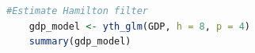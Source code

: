 \documentclass[addpoints,12pt,answers]{exam}
\begin{document}
\begin{enumerate}[label=\textbf{\arabic*.}, itemsep=15pt]
\begin{lstlisting}[language=R]
	#Estimate Hamilton filter
	gdp_model <- yth_glm(GDP, h = 8, p = 4)
	summary(gdp_model)
\end{lstlisting}
		



\end{enumerate}
\end{document}
